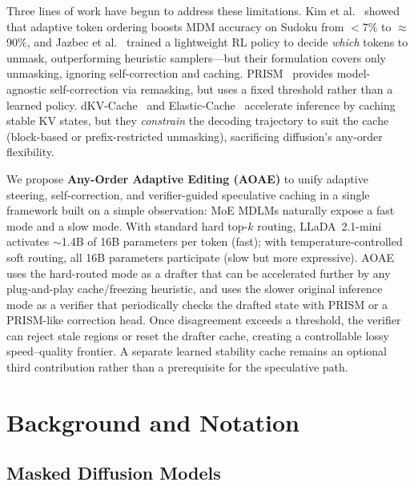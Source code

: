\documentclass[11pt]{article}
\begin{document}
Three lines of work have begun to address these limitations. Kim et al.~\cite{kim2025trainworst} showed that adaptive token ordering boosts MDM accuracy on Sudoku from $<$7\% to ${\approx}$90\%, and Jazbec et al.~\cite{jazbec2025learning} trained a lightweight RL policy to decide \emph{which} tokens to unmask, outperforming heuristic samplers---but their formulation covers only unmasking, ignoring self-correction and caching.
PRISM~\cite{kim2025prism} provides model-agnostic self-correction via remasking, but uses a fixed threshold rather than a learned policy.
dKV-Cache~\cite{ma2025dkv} and Elastic-Cache~\cite{elastic_cache} accelerate inference by caching stable KV states, but they \emph{constrain} the decoding trajectory to suit the cache (block-based or prefix-restricted unmasking), sacrificing diffusion's any-order flexibility.

We propose \textbf{Any-Order Adaptive Editing (AOAE)} to unify adaptive steering, self-correction, and verifier-guided speculative caching in a single framework built on a simple observation: MoE MDLMs naturally expose a fast mode and a slow mode.
With standard hard top-$k$ routing, LLaDA~2.1-mini activates ${\sim}$1.4B of 16B parameters per token (fast); with temperature-controlled soft routing, all 16B parameters participate (slow but more expressive).
AOAE uses the hard-routed mode as a drafter that can be accelerated further by any plug-and-play cache/freezing heuristic, and uses the slower original inference mode as a verifier that periodically checks the drafted state with PRISM or a PRISM-like correction head. Once disagreement exceeds a threshold, the verifier can reject stale regions or reset the drafter cache, creating a controllable lossy speed--quality frontier. A separate learned stability cache remains an optional third contribution rather than a prerequisite for the speculative path.

\section{Background and Notation}
\label{sec:background}

\subsection{Masked Diffusion Models}
\label{sec:bg_mdm}
\end{document}
